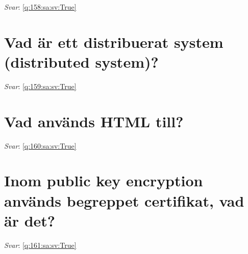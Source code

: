 \documentclass[a4paper,11pt,oneside]{book}
\begin{document}
\begin{sloppypar}
\label{q:158:sa:sv:False}

\vspace{2cm}

\noindent\makebox[\textwidth]{\hrulefill}

\vspace{1cm}

\textit{Svar}: \autoref{q:158:sa:sv:True}



\section{Vad \"ar ett distribuerat system (distributed system)?}

\label{q:159:sa:sv:False}

\vspace{2cm}

\noindent\makebox[\textwidth]{\hrulefill}

\vspace{1cm}

\textit{Svar}: \autoref{q:159:sa:sv:True}



\section{Vad anv\"ands HTML till?}

\label{q:160:sa:sv:False}

\vspace{2cm}

\noindent\makebox[\textwidth]{\hrulefill}

\vspace{1cm}

\textit{Svar}: \autoref{q:160:sa:sv:True}



\section{Inom public key encryption anv\"ands begreppet certifikat, vad \"ar det?}

\label{q:161:sa:sv:False}

\vspace{2cm}

\noindent\makebox[\textwidth]{\hrulefill}

\vspace{1cm}

\textit{Svar}: \autoref{q:161:sa:sv:True}




\end{sloppypar}
\end{document}

